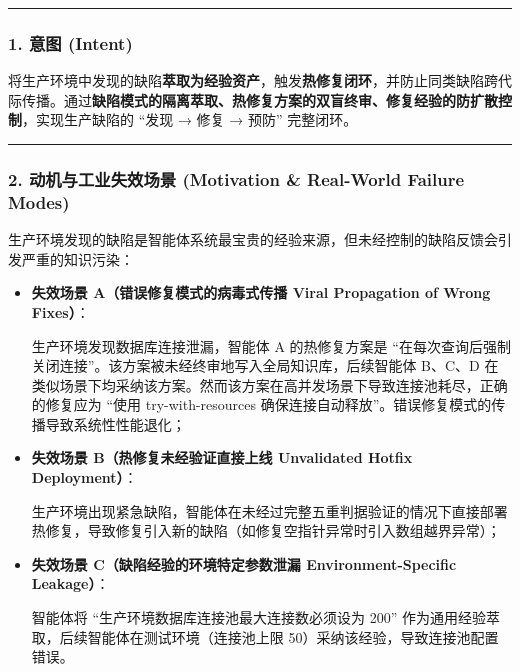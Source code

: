\documentclass[
]{ctexart}
\renewcommand{\_}{\discretionary{}{}{\textunderscore}}
\begin{document}
\begin{center}\rule{0.5\linewidth}{0.5pt}\end{center}

\subsubsection{1. 意图 (Intent)}\label{ux610fux56fe-intent-23}

将生产环境中发现的缺陷\textbf{萃取为经验资产}，触发\textbf{热修复闭环}，并防止同类缺陷跨代际传播。通过\textbf{缺陷模式的隔离萃取、热修复方案的双盲终审、修复经验的防扩散控制}，实现生产缺陷的
``发现 → 修复 → 预防'' 完整闭环。

\begin{center}\rule{0.5\linewidth}{0.5pt}\end{center}

\subsubsection{2. 动机与工业失效场景 (Motivation \& Real-World Failure
Modes)}\label{ux52a8ux673aux4e0eux5de5ux4e1aux5931ux6548ux573aux666f-motivation-real-world-failure-modes-23}

生产环境发现的缺陷是智能体系统最宝贵的经验来源，但未经控制的缺陷反馈会引发严重的知识污染：

\begin{itemize}
\item
  \textbf{失效场景 A（错误修复模式的病毒式传播 Viral Propagation of
  Wrong Fixes）}：

  生产环境发现数据库连接泄漏，智能体 A 的热修复方案是
  ``在每次查询后强制关闭连接''。该方案被未经终审地写入全局知识库，后续智能体
  B、C、D
  在类似场景下均采纳该方案。然而该方案在高并发场景下导致连接池耗尽，正确的修复应为
  ``使用 try-with-resources
  确保连接自动释放''。错误修复模式的传播导致系统性性能退化；
\item
  \textbf{失效场景 B（热修复未经验证直接上线 Unvalidated Hotfix
  Deployment）}：

  生产环境出现紧急缺陷，智能体在未经过完整五重判据验证的情况下直接部署热修复，导致修复引入新的缺陷（如修复空指针异常时引入数组越界异常）；
\item
  \textbf{失效场景 C（缺陷经验的环境特定参数泄漏 Environment-Specific
  Leakage）}：

  智能体将 ``生产环境数据库连接池最大连接数必须设为 200''
  作为通用经验萃取，后续智能体在测试环境（连接池上限
  50）采纳该经验，导致连接池配置错误。
\end{itemize}
\end{document}
